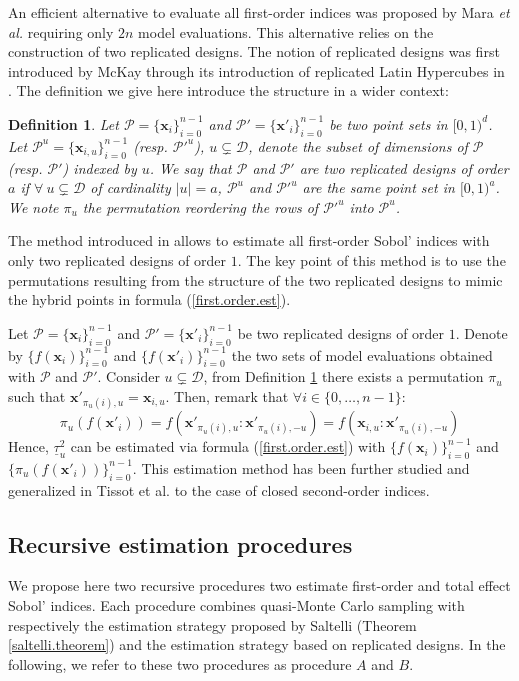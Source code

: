 \documentclass[]{elsarticle}
\newtheorem{definition}{Definition}
\theoremstyle{definition}
\newcommand{\bvec}[1]{\boldsymbol{#1}}
\newcommand{\vx}{\bvec{x}}
\begin{document}
An efficient alternative to evaluate all first-order indices was proposed by Mara \textit{et al.} \cite{Mara}  requiring only $2n$ model evaluations. This alternative relies on the construction of two replicated designs. The notion of replicated designs was first introduced by McKay through its introduction of replicated Latin Hypercubes in \cite{Mckay}. The definition we give here introduce the structure in a wider context:
\begin{definition}
\label{rep.designs}
Let $\mathcal{P}=\{\vx_i\}_{i=0}^{n-1}$ and $\mathcal{P}'=\{{\vx'}_i\}_{i=0}^{n-1}$ be two point sets in
$[0,1)^{d}$. Let $\mathcal{P}^u=\{\vx_{i,u}\}_{i=0}^{n-1}$ (resp. ${\mathcal{P}'}^u$), $u \subsetneq \mathcal{D}$, denote the subset of dimensions of $\mathcal{P}$ (resp. $\mathcal{P}'$) indexed by $u$. We say that $\mathcal{P}$ and $\mathcal{P}'$ are two replicated designs of order $a$ if $\forall \ u \subsetneq \mathcal{D}$ of cardinality $|u|=a$, $\mathcal{P}^u$ and ${\mathcal{P}'}^u$ are the same point set in $[0,1)^a$. We note $\pi_u$ the permutation reordering the rows of ${\mathcal{P}'}^u$ into $\mathcal{P}^u$.
\end{definition}
The method introduced in \cite{Mara} allows to estimate all first-order Sobol' indices with only two replicated designs of order $1$. The key point of this method is to use the permutations resulting from the structure of the two replicated designs to mimic the hybrid points in formula (\ref{first.order.est}). 

Let $\mathcal{P}=\{\vx_i\}_{i=0}^{n-1}$ and $\mathcal{P}'=\{{\vx'}_i\}_{i=0}^{n-1}$ be two replicated designs of order $1$. Denote by $\{f(\vx_i)\}_{i=0}^{n-1}$ and $\{f({\vx'}_i)\}_{i=0}^{n-1}$ the two sets of model evaluations obtained with $\mathcal{P}$ and $\mathcal{P}'$. Consider $u \subsetneq \mathcal{D}$, from Definition \ref{rep.designs} there exists a permutation $\pi_u$ such that ${\vx'}_{\pi_u(i),u}={\vx}_{i,u}$. Then, remark that $\forall i \in \{0,\dots,n-1\}$:
\[\pi_u(f({\vx'}_i))=f(\vx'_{\pi_u(i),u}:{\vx'}_{\pi_u(i),-u})=f(\vx_{i,u}:{\vx'}_{\pi_u(i),-u})\]
Hence, $\underline{\tau}^2_u$ can be estimated via formula (\ref{first.order.est}) with $\{f(\vx_i)\}_{i=0}^{n-1}$ and $\{\pi_u(f({\vx'}_i))\}_{i=0}^{n-1}$. This estimation method has been further studied and generalized in Tissot et al. \cite{Mara} to the case of closed second-order indices.
\bigskip

\subsection{Recursive estimation procedures}
We propose here two recursive procedures two estimate first-order and total effect Sobol' indices. Each procedure combines quasi-Monte Carlo sampling with respectively the estimation strategy proposed by Saltelli (Theorem \ref{saltelli.theorem}) and the estimation strategy based on replicated designs. In the following, we refer to these two procedures as procedure $A$ and $B$.
\bigskip
\end{document}
